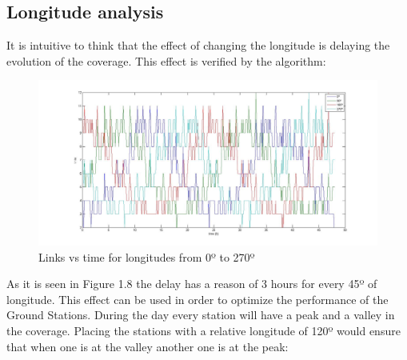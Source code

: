 \subsection{Longitude analysis}
It is intuitive to think that the effect of changing the longitude is delaying the evolution of the coverage. This effect is verified by the algorithm:

\begin{figure}[H]
\begin{center}
\includegraphics[scale=0.30]{0_90_270_long.jpg}
\caption{Links vs time for longitudes from 0º to 270º}
\end{center}
\end{figure}


As it is seen in Figure 1.8 the delay has a reason of 3 hours for every 45º of longitude. This effect can be used in order to optimize the performance of the Ground Stations. During the day every station will have a peak and a valley in the coverage. Placing the stations with a relative longitude of 120º would ensure that when one is at the valley another one is at the peak:

